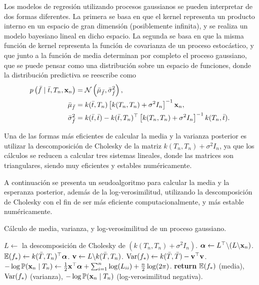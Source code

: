 Los modelos de regresión utilizando procesos gaussianos se pueden interpretar de dos formas diferentes. La primera se basa en que el kernel representa un producto interno en un espacio de gran dimensión (posiblemente infinita), y se realiza un modelo bayesiano lineal en dicho espacio. La segunda se basa en que la misma función de kernel representa la función de covarianza de un proceso estocástico, y que junto a la función de media determinan por completo el proceso gaussiano, que se puede pensar como una distribución sobre un espacio de funciones, donde la distribución predictiva se reescribe como
\begin{align*}
	p\left(\bar{f} \mid \bar{t}, T_n, \mathbf{x}_n\right)	&= \mathcal{N} \left(\bar{\mu}_{\bar{f}}, \bar{\sigma}_{\bar{f}}^2\right),\\
	\bar{\mu}_{\bar{f}}								&= k(\bar{t}, T_n) \left[k(T_n, T_n) + \sigma^2 I_n\right]^{-1} \mathbf{x}_n,\\
	\bar{\sigma}_{\bar{f}}^2						&= k(\bar{t}, \bar{t}) - k(\bar{t}, T_n)^{\top} \left[k(T_n, T_n) + \sigma^2 I_n\right]^{-1} k(T_n, \bar{t}).
\end{align*}

Una de las formas más eficientes de calcular la media y la varianza posterior es utilizar la descomposición de Cholesky de la matriz \(k(T_n, T_n) + \sigma^2 I_n\), ya que los cálculos se reducen a calcular tres sistemas lineales, donde las matrices son triangulares, siendo muy eficientes y estables numéricamente.

A continuación se presenta un seudoalgoritmo para calcular la media y la esperanza posterior, además de la log-verosimilitud, utilizando la descomposición de Cholesky con el fin de ser más eficiente computacionalmente, y más estable numéricamente.

\begin{algorithm}
	\caption{Cálculo de media, varianza, y log-verosimilitud de un proceso gaussiano.}
	\begin{algorithmic}[1]
		\State \(L \gets\) la descomposición de Cholesky de \((k (T_n, T_n) + \sigma^2 I_n)\).
		\State \(\boldsymbol{\alpha} \gets L^{\top} \backslash (L \backslash \mathbf{x}_n)\).
		\State \(\mathbb{E}(f_{\ast}) \gets k (\bar{T}, T_n)^{\top} \boldsymbol{\alpha}\).
		\State \(\mathbf{v} \gets L \backslash k(\bar{T}, T_n)\).
		\State \(\operatorname{Var}(f_{\ast}) \gets k(\bar{T}, \bar{T}) - \mathbf{v}^{\top} \mathbf{v}\).
		\State \(-\log \mathbb{P}(\mathbf{x}_n \mid T_n) \gets \frac{1}{2} \mathbf{x}^{\top} \boldsymbol{\alpha} + \sum_{i=1}^n \log(L_{ii}) + \frac{n}{2} \log(2\pi)\).
		\State \textbf{return} \(\mathbb{E}(f_{\ast})\) (media), \(\operatorname{Var}(f_{\ast})\) (varianza), \(-\log \mathbb{P}(\mathbf{x}_n \mid T_n)\) (log-verosimilitud negativa).
	\end{algorithmic}
\end{algorithm}

